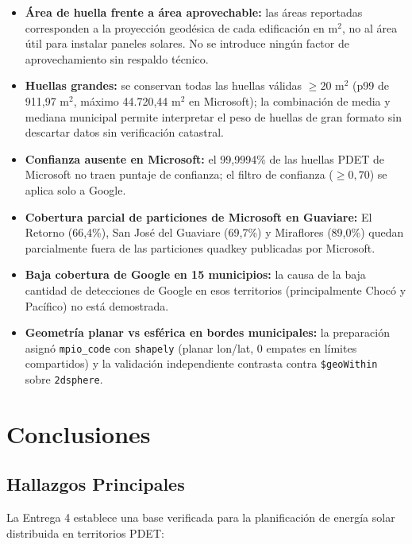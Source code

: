 \documentclass[11pt, a4paper]{article}
\begin{document}
\begin{itemize}
    \item \textbf{Área de huella frente a área aprovechable:} las áreas reportadas corresponden a la proyección geodésica de cada edificación en m$^2$, no al área útil para instalar paneles solares. No se introduce ningún factor de aprovechamiento sin respaldo técnico.
    \item \textbf{Huellas grandes:} se conservan todas las huellas válidas $\ge 20$ m$^2$ (p99 de 911,97 m$^2$, máximo 44.720,44 m$^2$ en Microsoft); la combinación de media y mediana municipal permite interpretar el peso de huellas de gran formato sin descartar datos sin verificación catastral.
    \item \textbf{Confianza ausente en Microsoft:} el 99,9994\% de las huellas PDET de Microsoft no traen puntaje de confianza; el filtro de confianza ($\ge 0{,}70$) se aplica solo a Google.
    \item \textbf{Cobertura parcial de particiones de Microsoft en Guaviare:} El Retorno (66,4\%), San José del Guaviare (69,7\%) y Miraflores (89,0\%) quedan parcialmente fuera de las particiones quadkey publicadas por Microsoft.
    \item \textbf{Baja cobertura de Google en 15 municipios:} la causa de la baja cantidad de detecciones de Google en esos territorios (principalmente Chocó y Pacífico) no está demostrada.
    \item \textbf{Geometría planar vs esférica en bordes municipales:} la preparación asignó \texttt{mpio\_code} con \texttt{shapely} (planar lon/lat, 0 empates en límites compartidos) y la validación independiente contrasta contra \texttt{\$geoWithin} sobre \texttt{2dsphere}.
\end{itemize}


\section{Conclusiones}

\subsection{Hallazgos Principales}

La Entrega 4 establece una base verificada para la planificación de energía solar distribuida en territorios PDET:
\end{document}
